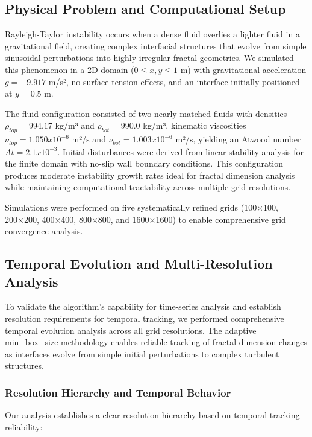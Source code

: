\documentclass[preprint,12pt]{elsarticle}
\def\times{x}%
\begin{document}
\subsection{Physical Problem and Computational Setup}
\label{subsec:rt_setup}

Rayleigh-Taylor instability occurs when a dense fluid overlies a lighter fluid in a gravitational field, creating complex interfacial structures that evolve from simple sinusoidal perturbations into highly irregular fractal geometries. We simulated this phenomenon in a 2D domain ($0 \leq x,y \leq 1$ m) with gravitational acceleration $g = -9.917$ m/s², no surface tension effects, and an interface initially positioned at $y = 0.5$ m.

The fluid configuration consisted of two nearly-matched fluids with densities $\rho_{top} = 994.17$ kg/m³ and $\rho_{bot} = 990.0$ kg/m³, kinematic viscosities $\nu_{top} = 1.050 \times 10^{-6}$ m²/s and $\nu_{bot} = 1.003 \times 10^{-6}$ m²/s, yielding an Atwood number $At = 2.1 \times 10^{-3}$. Initial disturbances were derived from linear stability analysis for the finite domain with no-slip wall boundary conditions. This configuration produces moderate instability growth rates ideal for fractal dimension analysis while maintaining computational tractability across multiple grid resolutions.

Simulations were performed on five systematically refined grids (100×100, 200×200, 400×400, 800×800, and 1600×1600) to enable comprehensive grid convergence analysis.

\subsection{Temporal Evolution and Multi-Resolution Analysis}
\label{subsec:temporal_evolution}

To validate the algorithm's capability for time-series analysis and establish resolution requirements for temporal tracking, we performed comprehensive temporal evolution analysis across all grid resolutions. The adaptive min\_box\_size methodology enables reliable tracking of fractal dimension changes as interfaces evolve from simple initial perturbations to complex turbulent structures.

\subsubsection{Resolution Hierarchy and Temporal Behavior}

Our analysis establishes a clear resolution hierarchy based on temporal tracking reliability:
\end{document}
